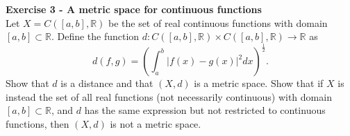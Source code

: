 \documentclass[12pt,a4paper]{article}
\begin{document}
\bigskip



\textbf{Exercise 3 - A metric space for continuous functions}\\
Let $X = C([a,b], \mathbb R)$ be the set of real continuous functions with domain $[a,b]\subset\mathbb R$. Define the function $d:C([a,b], \mathbb R)\times C([a,b], \mathbb R)\to \mathbb R$ as
\[d(f,g) = \left(\int_a^b |f(x)-g(x)|^2dx\right)^\frac{1}{2}.\]
Show that $d$ is a distance and that $(X,d)$ is a metric space. Show that if $X$ is instead the set of all real functions (not necessarily continuous) with domain $[a,b]\subset\mathbb R$, and $d$ has the same expression but not restricted to continuous functions, then $(X,d)$ is not a metric space.
\end{document}
